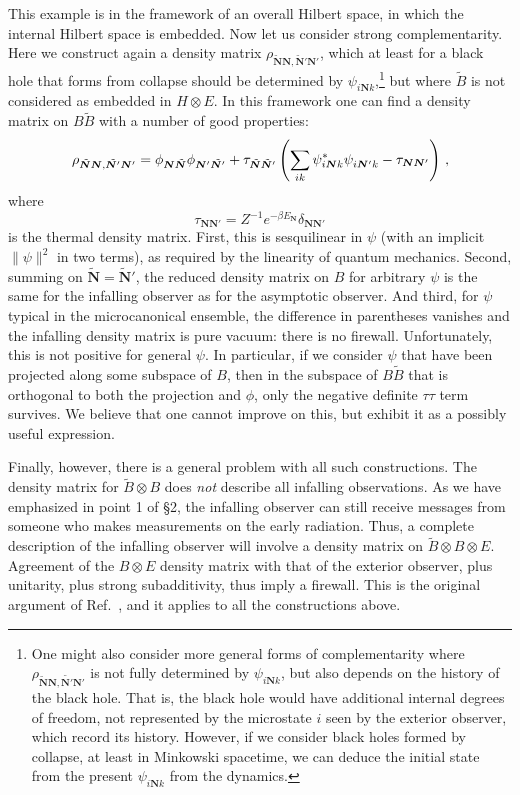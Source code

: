 \documentclass[12pt]{article}
\newcommand{\be}{\begin{equation}}
\newcommand{\ee}{\end{equation}}
\begin{document}
This example is in the framework of an overall Hilbert space, in which the internal Hilbert space is embedded.  Now let us consider strong complementarity.   Here we construct again a density matrix $\rho_{\tilde{\bm N} \bm N,\tilde{\bm N}' \bm N'}$, which at least for a black hole that forms from collapse should be determined by $\psi_{i\bm N k}$,\footnote{One might also consider more general forms of complementarity where $\rho_{\tilde{\bm N} \bm N,\tilde{\bm N'} \bm N'}$ is not fully determined by $\psi_{i\bm N k}$, but also depends on the history of the black hole.  That is, the black hole would have additional internal degrees of freedom, not represented by the microstate $i$ seen by the exterior observer, which record its history.  However, if we consider black holes formed by collapse, at least in Minkowski spacetime, we can deduce the initial state from the present $\psi_{i\bm N k}$ from the dynamics.} but where $\tilde B$ is not considered as embedded in $H \otimes E$.  {In this framework one can find a density matrix on $B\tilde B$ with a number of good properties:
\be
\rho_{\tilde{\bm N} \bm N,\tilde{\bm N'} \bm N'} = \phi_{\bm N \tilde{\bm N}}\phi_{\bm N' \tilde{\bm N{}'}}
+ \tau_{\tilde {\bm N}\tilde {\bm N}{}'} \left( \sum_{ik} \psi^*_{i\bm N k} \psi^{\vphantom*}_{i\bm N'k} - \tau_{\bm N\bm N'}
\right) \,,  \label{dmstrong}
\ee
where
\be
\tau_{ \bm N\bm N'} = Z^{-1} e^{-\beta{E_{\bm N}}} \delta_{ \bm N\bm N'}
\ee
is the thermal density matrix.
First, this is sesquilinear in $\psi$ (with an implicit $\|\psi\|^2$ in two terms), as required by the linearity of quantum mechanics.
Second, summing on $\tilde {\bm N} = \tilde {\bm N}{}'$, the reduced density matrix on $B$ for arbitrary $\psi$ is the same for the infalling observer as for the asymptotic observer.  And third, for $\psi$ typical in the microcanonical ensemble, the difference in parentheses vanishes and the infalling density matrix is pure vacuum: there is no firewall.  Unfortunately, this is not positive for general $\psi$.  In particular, if we consider $\psi$ that have been projected along some subspace of $B$, then in the subspace of $B\tilde B$ that is orthogonal to both the projection and $\phi$, only the negative definite $\tau\tau$ term survives.  We believe that one cannot improve on this, but exhibit it as a possibly useful expression.}





Finally, however, there is a general problem with all such constructions.  The density matrix for $\tilde B \otimes B$ does {\it not} describe all infalling observations.  As we have emphasized in point 1 of \S2, the infalling observer can still receive messages from someone who makes measurements on the early radiation.  Thus, a complete description of the infalling observer will involve a density matrix on $\tilde B \otimes B \otimes E$.
Agreement of the $B \otimes E$ density matrix with that of the exterior observer, plus unitarity, plus strong subadditivity, thus imply a firewall.  This is the original argument of Ref.~\cite{Almheiri:2012rt}, and it applies to all the constructions above.
\end{document}
